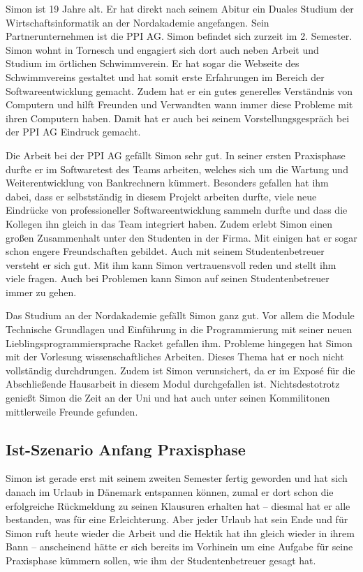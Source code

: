 \documentclass[
  12pt,
  ngerman,
  a4paper,
]{article}
\begin{document}
Simon ist 19 Jahre alt. Er hat direkt nach seinem Abitur ein Duales
Studium der Wirtschaftsinformatik an der Nordakademie angefangen. Sein
Partnerunternehmen ist die PPI AG. Simon befindet sich zurzeit im 2.
Semester. Simon wohnt in Tornesch und engagiert sich dort auch neben
Arbeit und Studium im örtlichen Schwimmverein. Er hat sogar die Webseite
des Schwimmvereins gestaltet und hat somit erste Erfahrungen im Bereich
der Softwareentwicklung gemacht. Zudem hat er ein gutes generelles
Verständnis von Computern und hilft Freunden und Verwandten wann immer
diese Probleme mit ihren Computern haben. Damit hat er auch bei seinem
Vorstellungsgespräch bei der PPI AG Eindruck gemacht.

Die Arbeit bei der PPI AG gefällt Simon sehr gut. In seiner ersten
Praxisphase durfte er im Softwaretest des Teams arbeiten, welches sich
um die Wartung und Weiterentwicklung von Bankrechnern kümmert. Besonders
gefallen hat ihm dabei, dass er selbstständig in diesem Projekt arbeiten
durfte, viele neue Eindrücke von professioneller Softwareentwicklung
sammeln durfte und dass die Kollegen ihn gleich in das Team integriert
haben. Zudem erlebt Simon einen großen Zusammenhalt unter den Studenten
in der Firma. Mit einigen hat er sogar schon engere Freundschaften
gebildet. Auch mit seinem Studentenbetreuer versteht er sich gut. Mit
ihm kann Simon vertrauensvoll reden und stellt ihm viele fragen. Auch
bei Problemen kann Simon auf seinen Studentenbetreuer immer zu gehen.

Das Studium an der Nordakademie gefällt Simon ganz gut. Vor allem die
Module Technische Grundlagen und Einführung in die Programmierung mit
seiner neuen Lieblingsprogrammiersprache Racket gefallen ihm. Probleme
hingegen hat Simon mit der Vorlesung wissenschaftliches Arbeiten. Dieses
Thema hat er noch nicht vollständig durchdrungen. Zudem ist Simon
verunsichert, da er im Exposé für die Abschließende Hausarbeit in diesem
Modul durchgefallen ist. Nichtsdestotrotz genießt Simon die Zeit an der
Uni und hat auch unter seinen Kommilitonen mittlerweile Freunde
gefunden.

\hypertarget{ist-szenario-anfang-praxisphase}{%
\subsection{Ist-Szenario Anfang
Praxisphase}\label{ist-szenario-anfang-praxisphase}}

Simon ist gerade erst mit seinem zweiten Semester fertig geworden und
hat sich danach im Urlaub in Dänemark entspannen können, zumal er dort
schon die erfolgreiche Rückmeldung zu seinen Klausuren erhalten hat --
diesmal hat er alle bestanden, was für eine Erleichterung. Aber jeder
Urlaub hat sein Ende und für Simon ruft heute wieder die Arbeit und die
Hektik hat ihn gleich wieder in ihrem Bann -- anscheinend hätte er sich
bereits im Vorhinein um eine Aufgabe für seine Praxisphase kümmern
sollen, wie ihm der Studentenbetreuer gesagt hat.
\end{document}
